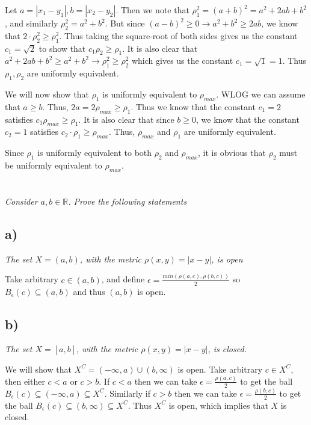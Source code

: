 \documentclass[]{article}
\newcommand{\reals}{\mathbb{R}}
\begin{document}
		Let $a = |x_1 - y_1|, b = |x_2 - y_2|$. Then we note that $\rho_1^2 = (a + b)^2 = a^2 + 2ab + b^2$, and similarly $\rho_2^2 = a^2 + b^2$. But since $(a - b)^2 \geq 0 \to a^2 + b^2 \geq 2ab$, we know that $2 \cdot \rho_2^2 \geq \rho_1^2$. Thus taking the square-root of both sides gives us the constant $c_1 = \sqrt{2}$ to show that $c_1 \rho_2 \geq \rho_1$. It is also clear that $a^2 + 2ab + b^2 \geq a^2 + b^2 \to \rho_1^2 \geq \rho_2^2$ which gives us the constant $c_1 = \sqrt{1} = 1$. Thus $\rho_1, \rho_2$ are uniformly equivalent.

		We will now show that $\rho_1$ is uniformly equivalent to $\rho_{max}$. WLOG we can assume that $a \geq b$. Thus, $2a = 2 \rho_{max} \geq \rho_1$. Thus we know that the constant $c_1 = 2$ satisfies $c_1 \rho_{max} \geq \rho_1$. It is also clear that since $b \geq 0$, we know that the constant $c_2 = 1$ satisfies $c_2 \cdot \rho_1 \geq \rho_{max}$. Thus, $\rho_{max}$ and $\rho_1$ are uniformly equivalent. 

		Since $\rho_1$ is uniformly equivalent to both $\rho_2$ and $\rho_{max}$, it is obvious that $\rho_2$ must be uniformly equivalent to $\rho_{max}$. 

	\section{}
		\textit{Consider $a, b \in \reals$. Prove the following statements}

			\subsection*{a)} \textit{The set $X = (a, b)$, with the metric $\rho(x, y) = |x - y|$, is open}

			Take arbitrary $c \in (a, b)$, and define $\epsilon = \frac{min(\rho(a, c), \rho(b, c))}{2}$ so $B_{\epsilon}(c) \subseteq (a, b)$ and thus $(a, b)$ is open.

			\subsection*{b)} \textit{The set $X = [a, b]$, with the metric $\rho(x, y) = |x - y|$, is closed.}

			We will show that $X^C = (- \infty, a) \cup (b, \infty)$ is open. Take arbitrary $c \in X^C$, then either $c < a$ or $c > b$. If $c < a$ then we can take $\epsilon = \frac{\rho(a, c)}{2}$ to get the ball $B_{\epsilon}(c) \subseteq (- \infty, a) \subseteq X^C$. Similarly if $c > b$ then we can take $\epsilon = \frac{\rho(b, c)}{2}$ to get the ball $B_{\epsilon}(c) \subseteq (b, \infty) \subseteq X^C$. Thus $X^C$ is open, which implies that $X$ is closed. 
\end{document}
